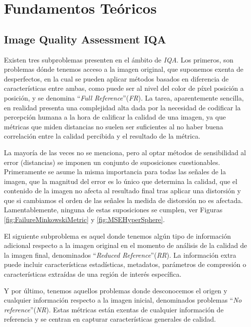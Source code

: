 \chapter{Fundamentos Teóricos}
\section{Image Quality Assessment IQA}
Existen tres subproblemas presenten en el ámbito de \emph{IQA}. Los primeros, son problemas 
dónde tenemos acceso a la imagen original, que suponemos exenta de desperfectos, 
en la cual se pueden aplicar métodos basados en diferencia de características 
entre ambas, como puede ser al nivel del color de píxel posición a posición,
y se denomina ``\emph{Full Reference}''(\emph{FR}). 
La tarea, aparentemente sencilla, en realidad presenta una complejidad alta dada por 
la necesidad de codificar la percepción humana a la hora de calificar la calidad 
de una imagen\cite{WhyIsIQASoDifficult}, ya que métricas que miden distancias no suelen 
ser suficientes al no haber buena correlación entre la calidad percibida y el 
resultado de la métrica.

La mayoría de las veces no se menciona, pero al optar métodos de sensibilidad 
al error (distancias) se imponen un conjunto de suposiciones cuestionables. 
Primeramente se asume la misma importancia para todas las señales de la imagen, que
la magnitud del error es lo único que determina la calidad, que el contenido de la imagen 
no afecta al resultado final tras aplicar una distorsión y que si cambiamos el 
orden de las señales la medida de distorsión no es afectada.
Lamentablemente, ninguna de estas suposiciones se cumplen\cite{Wang2006ModernIQ}, ver Figuras \ref{fig:FailureMinkowskiMetric} y \ref{fig:MSEHyperSphere}.
 
El siguiente subproblema es aquel donde tenemos algún tipo de información adicional respecto 
a la imagen original en el momento de análisis de la calidad de la imagen final,
denominados ``\emph{Reduced Reference}''(\emph{RR}). La información extra puede incluir características estadísticas, metadatos, parámetros 
de compresión o características extraídas de una región de interés específica.
 
Y por último, tenemos aquellos problemas donde desconocemos el origen y cualquier 
información respecto a la imagen inicial, denominados problemas ``\emph{No reference}''(\emph{NR}).
Estas métricas están exentas de cualquier información de referencia y se 
centran en capturar características generales de calidad.

